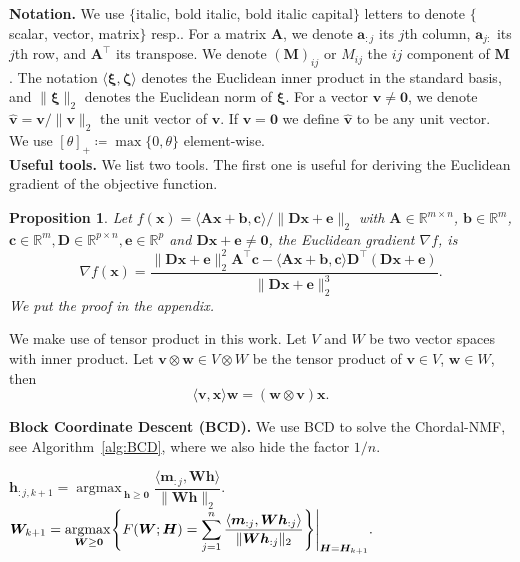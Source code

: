 \documentclass[sn-mathphys-num]{sn-jnl}
\DeclareMathOperator*{\argmax}{\textrm{argmax}\,} %
\def\zeros           {\bm{0}}            %
\def\IR  {\mathbb{R}} 	    %
\def\IRm {\IR^{m}} 			%
\def\IRmn{\IR^{m \times n}} %
\def\A {\bm{A}}
\def\D {\bm{D}}
\def\H {\bm{H}}
\def\M {\bm{M}}
\def\W {\bm{W}}
\def\a {\bm{a}}
\def\b {\bm{b}}
\def\c {\bm{c}}
\def\e {\bm{e}}
\def\h {\bm{h}}
\def\m {\bm{m}}
\def\v {\bm{v}}
\def\w {\bm{w}}
\def\x {\bm{x}}
\def\bzeta    {\boldsymbol{\zeta}}
\def\bxi      {\boldsymbol{\xi}}
\newtheorem{proposition}[theorem]{Proposition}
\begin{document}
\noindent\textbf{Notation.}
We use $\{$italic, bold italic, bold italic capital$\}$ letters to denote $\{$scalar, vector, matrix$\}$ resp..
For a matrix $\A$, we denote $\a_{:j}$ its $j$th column, $\a_{j:}$ its $j$th row, and $\A^\top$ its transpose.
We denote $(\M)_{ij}$ or $M_{ij}$ the $ij$ component of $\M$.
The notation $\langle \bxi, \bzeta \rangle$ denotes the Euclidean inner product in the standard basis,
and $\| \bxi \|_2$ denotes the Euclidean norm of $\bxi$.
For a vector $\v \neq \zeros$, we denote $\hat{\v}=\v / \| \v \|_2$ the unit vector of $\v$.
If $\v = \zeros$ we define $\hat{\v}$ to be any unit vector.
We use $[\theta]_+ \coloneqq \max\{0,\theta\}$ element-wise.
\\

\noindent\textbf{Useful tools.}
We list two tools.
The first one is useful for deriving the Euclidean gradient of the objective function.

\begin{proposition}\label{prop:grad_f}
Let $f(\x) = \langle \A \x + \b, \c \rangle / \| \D \x + \e \|_2$ with $\A \in \IRmn$, $\b \in \IRm$, $\c \in \IRm, \D \in \IR^{p \times n}, \e \in \IR^p$ and $\D \x + \e \neq \zeros$, the Euclidean gradient $\nabla f$, is 
\[
\nabla f(\x)
=
\dfrac{\| \D \x + \e \|_2^2 \A^\top \c
-
\langle \A \x + \b, \c \rangle
\D^\top (\D \x + \e)}
{\| \D \x + \e \|_2^3 }
.
\]
We put the proof in the appendix.
\end{proposition}

We make use of tensor product in this work.
Let $V$ and $W$ be two vector spaces with inner product.
Let $\v \otimes \w \in V \otimes W$ be the tensor product of $\v \in V$, $\w \in W$, then 
\begin{equation}\label{formula:tensor}
\langle \v, \x \rangle \w = (\w \otimes \v) \x.
\end{equation}



\noindent\textbf{Block Coordinate Descent (BCD).}
We use BCD to solve the Chordal-NMF, see Algorithm~\ref{alg:BCD}, where we also hide the factor $1/n$.

\begin{algorithm}
\caption{BCD for Chordal-NMF, with a starting point $(\W_0, \H_0)$}
\label{alg:BCD}
\begin{algorithmic}[1]
\For{$j=1,2,...,n$ (update $\displaystyle \H_{k+1} $ column-wise)} 
        \State {} 
        $ \displaystyle \h_{:j, k+1} = \argmax_{\h\geq \zeros}  
        \dfrac{\langle \m_{:j} , \W\h \big\rangle }{\|  \W\h \|_2}.$
\EndFor
\State {}
$\displaystyle 
\W_{k+1}
=
\argmax_{\W\geq \zeros} \hspace{-1mm} 
\Bigg\{
F(\W;\H)
=
\displaystyle
\sum_{j=1}^n
\dfrac{\langle \m_{:j} , \W\h_{:j} \rangle }{\|  \W\h_{:j} \|_2}
\Bigg\}
\Bigg|_{\H = \H_{k+1}}.$
\EndFor
\end{algorithmic}
\end{algorithm}
\end{document}
